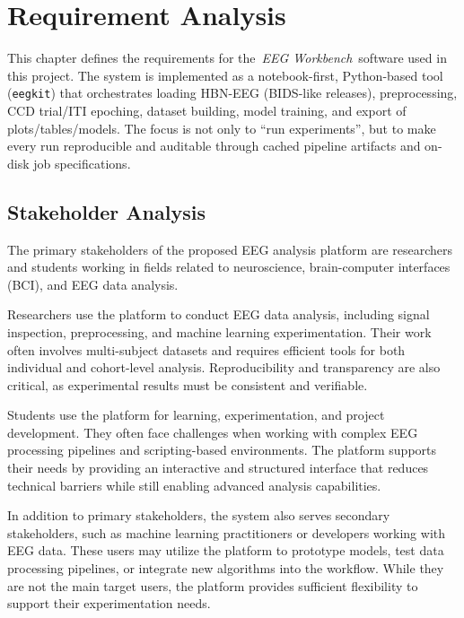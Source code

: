 \chapter{Requirement Analysis}
\label{ch:requirement-analysis}

\noindent
This chapter defines the requirements for the \,\textit{EEG Workbench}\, software used in this project. The system is implemented as a notebook-first, Python-based tool (\texttt{eegkit}) that orchestrates loading HBN-EEG (BIDS-like releases), preprocessing, CCD trial/ITI epoching, dataset building, model training, and export of plots/tables/models. The focus is not only to “run experiments”, but to make every run reproducible and auditable through cached pipeline artifacts and on-disk job specifications.
\vspace{1em}

\section{Stakeholder Analysis}
\label{sec:stakeholder-analysis}

The primary stakeholders of the proposed EEG analysis platform are researchers and students working in fields related to neuroscience, brain-computer interfaces (BCI), and EEG data analysis.
\vspace{0.5em}

Researchers use the platform to conduct EEG data analysis, including signal inspection, preprocessing, and machine learning experimentation. Their work often involves multi-subject datasets and requires efficient tools for both individual and cohort-level analysis. Reproducibility and transparency are also critical, as experimental results must be consistent and verifiable.
\vspace{0.5em}

Students use the platform for learning, experimentation, and project development. They often face challenges when working with complex EEG processing pipelines and scripting-based environments. The platform supports their needs by providing an interactive and structured interface that reduces technical barriers while still enabling advanced analysis capabilities.
\vspace{0.5em}

In addition to primary stakeholders, the system also serves secondary stakeholders, such as machine learning practitioners or developers working with EEG data. These users may utilize the platform to prototype models, test data processing pipelines, or integrate new algorithms into the workflow. While they are not the main target users, the platform provides sufficient flexibility to support their experimentation needs.
\vspace{0.5em}

